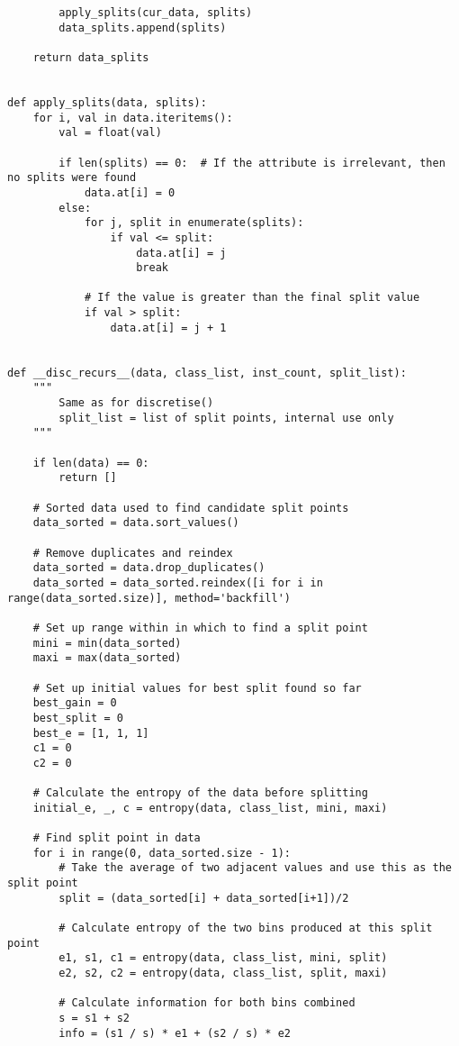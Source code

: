 \documentclass[11pt, a4paper]{article}
\begin{document}
\begin{verbatim}
        apply_splits(cur_data, splits)
        data_splits.append(splits)
        
    return data_splits


def apply_splits(data, splits):
    for i, val in data.iteritems():
        val = float(val)
        
        if len(splits) == 0:  # If the attribute is irrelevant, then no splits were found
            data.at[i] = 0
        else:
            for j, split in enumerate(splits):
                if val <= split:
                    data.at[i] = j
                    break

            # If the value is greater than the final split value
            if val > split:
                data.at[i] = j + 1


def __disc_recurs__(data, class_list, inst_count, split_list):
    """ 
        Same as for discretise()
        split_list = list of split points, internal use only
    """
    
    if len(data) == 0:
        return []
      
    # Sorted data used to find candidate split points
    data_sorted = data.sort_values()
    
    # Remove duplicates and reindex
    data_sorted = data.drop_duplicates()
    data_sorted = data_sorted.reindex([i for i in range(data_sorted.size)], method='backfill')
    
    # Set up range within in which to find a split point
    mini = min(data_sorted)
    maxi = max(data_sorted)
    
    # Set up initial values for best split found so far
    best_gain = 0
    best_split = 0
    best_e = [1, 1, 1]
    c1 = 0
    c2 = 0
    
    # Calculate the entropy of the data before splitting
    initial_e, _, c = entropy(data, class_list, mini, maxi)
    
    # Find split point in data
    for i in range(0, data_sorted.size - 1):
        # Take the average of two adjacent values and use this as the split point
        split = (data_sorted[i] + data_sorted[i+1])/2

        # Calculate entropy of the two bins produced at this split point
        e1, s1, c1 = entropy(data, class_list, mini, split)
        e2, s2, c2 = entropy(data, class_list, split, maxi)

        # Calculate information for both bins combined
        s = s1 + s2
        info = (s1 / s) * e1 + (s2 / s) * e2


\end{verbatim}
\end{document}
